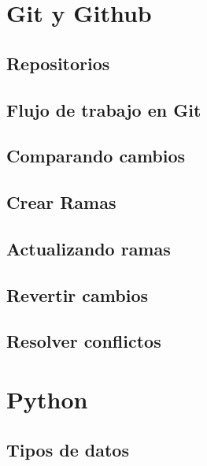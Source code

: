 \documentclass[
]{book}
\begin{document}
\hypertarget{git-y-github}{%
\chapter{Git y Github}\label{git-y-github}}

\hypertarget{repositorios}{%
\section{Repositorios}\label{repositorios}}

\hypertarget{flujo-de-trabajo-en-git}{%
\section{Flujo de trabajo en Git}\label{flujo-de-trabajo-en-git}}

\hypertarget{comparando-cambios}{%
\section{Comparando cambios}\label{comparando-cambios}}

\hypertarget{crear-ramas}{%
\section{Crear Ramas}\label{crear-ramas}}

\hypertarget{actualizando-ramas}{%
\section{Actualizando ramas}\label{actualizando-ramas}}

\hypertarget{revertir-cambios}{%
\section{Revertir cambios}\label{revertir-cambios}}

\hypertarget{resolver-conflictos}{%
\section{Resolver conflictos}\label{resolver-conflictos}}

\hypertarget{python}{%
\chapter{Python}\label{python}}

\hypertarget{tipos-de-datos}{%
\section{Tipos de datos}\label{tipos-de-datos}}
\end{document}
